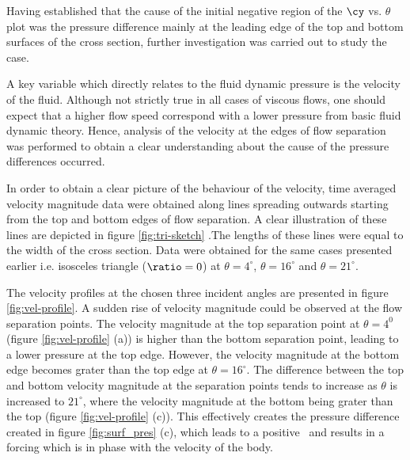 Having established that the cause of the initial negative region of the $\cy$ vs. $\theta$ plot was the pressure difference mainly at the leading edge of the top and bottom surfaces of the cross section, further investigation was carried out to study the case.


A key variable which directly relates to the fluid dynamic pressure is the velocity of the fluid. Although not strictly true in all cases of viscous flows, one should expect that a higher flow speed correspond with a lower pressure from basic fluid dynamic theory. Hence, analysis of the velocity at the edges of flow separation was performed to obtain a clear understanding about the cause of the pressure differences occurred.   


In order to obtain a clear picture of the behaviour of the velocity, time averaged velocity magnitude data were obtained along lines spreading outwards starting from the top and bottom edges of flow separation. A clear illustration of these lines are depicted in figure \ref{fig:tri-sketch} .The lengths of these lines were equal to the width of the cross section. Data were obtained for the same cases presented earlier i.e. isosceles triangle ($\ratio=0$) at $\theta=4^{\circ}$, $\theta=16^{\circ}$ and $\theta=21^{\circ}$.



The velocity profiles at the chosen three incident angles are presented in figure \ref{fig:vel-profile}. A sudden rise of velocity magnitude could be observed at the flow separation points. The velocity magnitude at the top separation point  at $\theta= 4^{0}$ (figure \ref{fig:vel-profile} (a)) is higher than the bottom separation point, leading to a lower pressure at the top edge. However, the velocity magnitude at the bottom edge becomes grater than the top edge at $\theta=16^{\circ}$. The difference between the top and bottom velocity magnitude at the separation points tends to increase as $\theta$ is increased to $21^{\circ}$, where the velocity magnitude at the bottom being grater than the top (figure \ref{fig:vel-profile} (c)). This effectively creates the pressure difference created in figure \ref{fig:surf_pres} (c), which leads to a positive \cy\ and results in a forcing which is in phase with the velocity of the body. 



